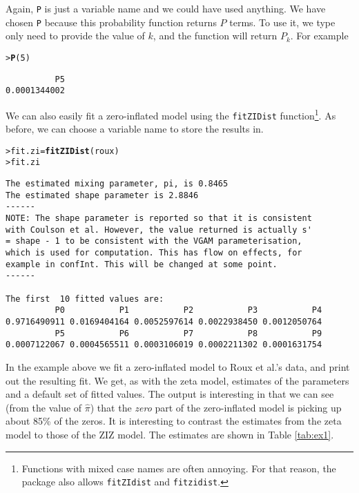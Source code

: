 \documentclass{article}\usepackage[]{graphicx}\usepackage[]{xcolor}
\makeatletter
\newcommand{\hlnum}[1]{\textcolor[rgb]{0.686,0.059,0.569}{#1}}%
\newcommand{\hlstd}[1]{\textcolor[rgb]{0.345,0.345,0.345}{#1}}%
\newcommand{\hlkwb}[1]{\textcolor[rgb]{0.69,0.353,0.396}{#1}}%
\newcommand{\hlkwd}[1]{\textcolor[rgb]{0.737,0.353,0.396}{\textbf{#1}}}%
\newenvironment{kframe}{%
 \def\at@end@of@kframe{}%
 \ifinner\ifhmode%
  \def\at@end@of@kframe{\end{minipage}}%
  \begin{minipage}{\columnwidth}%
 \fi\fi%
 \def\FrameCommand##1{\hskip\@totalleftmargin \hskip-\fboxsep
 \colorbox{shadecolor}{##1}\hskip-\fboxsep
     \hskip-\linewidth \hskip-\@totalleftmargin \hskip\columnwidth}%
 \MakeFramed {\advance\hsize-\width
   \@totalleftmargin\z@ \linewidth\hsize
   \@setminipage}}%
 {\par\unskip\endMakeFramed%
 \at@end@of@kframe}
\newenvironment{knitrout}{}{} %
\newcommand{\rcode}[1]{\lstinline[language=R,basicstyle=\normalsize\ttfamily]!#1!}
\makeatother
\begin{document}
Again, \rcode{P} is just a variable name and we could have used anything. We have chosen \rcode{P} because this probability function returns $P$ terms. To use it, we type only need to provide the value of $k$, and the function will return $P_k$. For example
\begin{knitrout}
\color{fgcolor}\begin{kframe}
\begin{alltt}
\hlstd{> }\hlkwd{P}\hlstd{(}\hlnum{5}\hlstd{)}
\end{alltt}
\begin{verbatim}
          P5 
0.0001344002 
\end{verbatim}
\end{kframe}
\end{knitrout}
We can also easily fit a zero-inflated model using the \rcode{fitZIDist} function\footnote{Functions with mixed case names are often annoying. For that reason, the package also allows \rcode{fitZIdist} and \rcode{fitzidist}.}. As before, we can choose a variable name to store the results in.
\begin{knitrout}
\color{fgcolor}\begin{kframe}
\begin{alltt}
\hlstd{> }\hlstd{fit.zi} \hlkwb{=} \hlkwd{fitZIDist}\hlstd{(roux)}
\hlstd{> }\hlstd{fit.zi}
\end{alltt}
\begin{verbatim}
The estimated mixing parameter, pi, is 0.8465 
The estimated shape parameter is 2.8846 
------
NOTE: The shape parameter is reported so that it is consistent
with Coulson et al. However, the value returned is actually s'
= shape - 1 to be consistent with the VGAM parameterisation,
which is used for computation. This has flow on effects, for
example in confInt. This will be changed at some point.
------

The first  10 fitted values are:
          P0           P1           P2           P3           P4 
0.9716490911 0.0169404164 0.0052597614 0.0022938450 0.0012050764 
          P5           P6           P7           P8           P9 
0.0007122067 0.0004565511 0.0003106019 0.0002211302 0.0001631754 
\end{verbatim}
\end{kframe}
\end{knitrout}
In the example above we fit a zero-inflated model to Roux et al.'s data, and print out the resulting fit. We get, as with the zeta model, estimates of the parameters and a default set of fitted values. The output is interesting in that we can see (from the value of $\hat{\pi}$) that the \emph{zero} part of the zero-inflated model is picking up about 85\% of the zeros. It is interesting to contrast the estimates from the zeta model to those of the ZIZ model. The estimates are shown in Table \ref{tab:ex1}.
\end{document}
